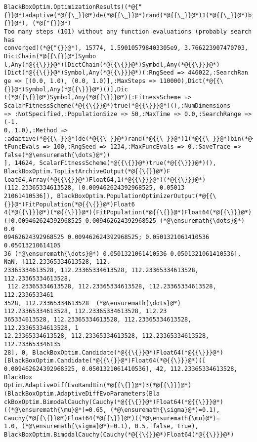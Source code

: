 \documentclass[12pt,a4paper]{article}
\begin{document}
\begin{lstlisting}
BlackBoxOptim.OptimizationResults((*@{"{}}@*)adaptive(*@{{\_}}@*)de(*@{{\_}}@*)rand(*@{{\_}}@*)1(*@{{\_}}@*)bin(*@{{\_}}@*)radiuslimited(*@{"{}}@*), (*@{"{}}@*)
Too many steps (101) without any function evaluations (probably search has 
converged)(*@{"{}}@*), 15774, 1.590105798403305e9, 3.766223907470703, DictChain(*@{{\{}}@*)Symbo
l,Any(*@{{\}}}@*)[DictChain(*@{{\{}}@*)Symbol,Any(*@{{\}}}@*)[Dict(*@{{\{}}@*)Symbol,Any(*@{{\}}}@*)(:RngSeed => 446022,:SearchRan
ge => [(0.0, 1.0), (0.0, 1.0)],:MaxSteps => 110000),Dict(*@{{\{}}@*)Symbol,Any(*@{{\}}}@*)()],Dic
t(*@{{\{}}@*)Symbol,Any(*@{{\}}}@*)(:FitnessScheme => ScalarFitnessScheme(*@{{\{}}@*)true(*@{{\}}}@*)(),:NumDimensions 
=> :NotSpecified,:PopulationSize => 50,:MaxTime => 0.0,:SearchRange => (-1.
0, 1.0),:Method => :adaptive(*@{{\_}}@*)de(*@{{\_}}@*)rand(*@{{\_}}@*)1(*@{{\_}}@*)bin(*@{{\_}}@*)radiuslimited,:MaxNumStepsWithou
tFuncEvals => 100,:RngSeed => 1234,:MaxFuncEvals => 0,:SaveTrace => false(*@\ensuremath{\dots}@*))
], 14624, ScalarFitnessScheme(*@{{\{}}@*)true(*@{{\}}}@*)(), BlackBoxOptim.TopListArchiveOutput(*@{{\{}}@*)F
loat64,Array(*@{{\{}}@*)Float64,1(*@{{\}}}@*)(*@{{\}}}@*)(112.23365334613528, [0.009462624392968525, 0.05013
21061410536]), BlackBoxOptim.PopulationOptimizerOutput(*@{{\{}}@*)FitPopulation(*@{{\{}}@*)Float6
4(*@{{\}}}@*)(*@{{\}}}@*)(FitPopulation(*@{{\{}}@*)Float64(*@{{\}}}@*)([0.009462624392968525 0.009462624392968525 (*@\ensuremath{\dots}@*) 0.0
09462624392968525 0.009462624392968525; 0.0501321061410536 0.05013210614105
36 (*@\ensuremath{\dots}@*) 0.0501321061410536 0.0501321061410536], NaN, [112.23365334613528, 112.
23365334613528, 112.23365334613528, 112.23365334613528, 112.23365334613528,
 112.23365334613528, 112.23365334613528, 112.23365334613528, 112.2336533461
3528, 112.23365334613528  (*@\ensuremath{\dots}@*)  112.23365334613528, 112.23365334613528, 112.23
365334613528, 112.23365334613528, 112.23365334613528, 112.23365334613528, 1
12.23365334613528, 112.23365334613528, 112.23365334613528, 112.233653346135
28], 0, BlackBoxOptim.Candidate(*@{{\{}}@*)Float64(*@{{\}}}@*)[BlackBoxOptim.Candidate(*@{{\{}}@*)Float64(*@{{\}}}@*)([
0.009462624392968525, 0.0501321061410536], 42, 112.23365334613528, BlackBox
Optim.AdaptiveDiffEvoRandBin(*@{{\{}}@*)3(*@{{\}}}@*)(BlackBoxOptim.AdaptiveDiffEvoParameters(Bla
ckBoxOptim.BimodalCauchy(Cauchy(*@{{\{}}@*)Float64(*@{{\}}}@*)((*@\ensuremath{\mu}@*)=0.65, (*@\ensuremath{\sigma}@*)=0.1), Cauchy(*@{{\{}}@*)Float64(*@{{\}}}@*)((*@\ensuremath{\mu}@*)=
1.0, (*@\ensuremath{\sigma}@*)=0.1), 0.5, false, true), BlackBoxOptim.BimodalCauchy(Cauchy(*@{{\{}}@*)Float64(*@{{\}}}@*)

\end{lstlisting}
\end{document}
